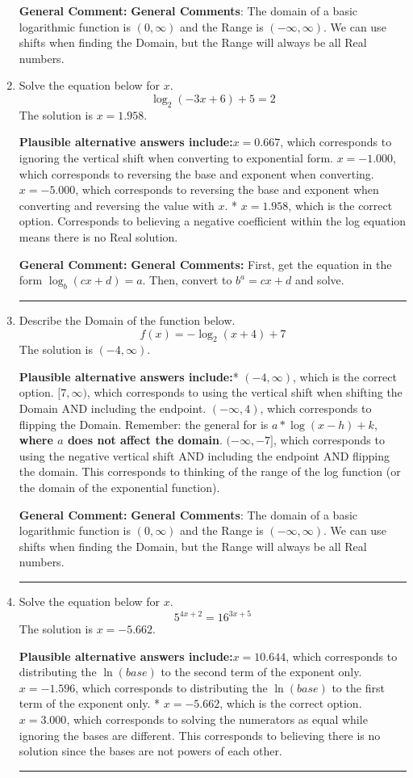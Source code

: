 \documentclass{extbook}[14pt]
\newcommand{\litem}[1]{\item #1

\rule{\textwidth}{0.4pt}}
\begin{document}
\begin{enumerate}
{\textbf{General Comment:} \textbf{General Comments}: The domain of a basic logarithmic function is $(0, \infty)$ and the Range is $(-\infty, \infty)$. We can use shifts when finding the Domain, but the Range will always be all Real numbers.
}
\litem{
Solve the equation below for $x$.
\[ \log_{2}{(-3x+6)}+5 = 2 \]The solution is \( x = 1.958 \).\begin{enumerate}[label=\Alph*.]
\textbf{Plausible alternative answers include:}$x = 0.667$, which corresponds to ignoring the vertical shift when converting to exponential form.
$x = -1.000$, which corresponds to reversing the base and exponent when converting.
$x = -5.000$, which corresponds to reversing the base and exponent when converting and reversing the value with $x$.
* $x = 1.958$, which is the correct option.
Corresponds to believing a negative coefficient within the log equation means there is no Real solution.
\end{enumerate}

\textbf{General Comment:} \textbf{General Comments:} First, get the equation in the form $\log_b{(cx+d)} = a$. Then, convert to $b^a = cx+d$ and solve.
}
\litem{
Describe the Domain of the function below.
\[ f(x) = -\log_2{(x+4)}+7 \]The solution is \( (-4, \infty) \).\begin{enumerate}[label=\Alph*.]
\textbf{Plausible alternative answers include:}* $(-4, \infty)$, which is the correct option.
$[7, \infty)$, which corresponds to using the vertical shift when shifting the Domain AND including the endpoint.
$(-\infty, 4)$, which corresponds to flipping the Domain. Remember: the general for is $a*\log(x-h)+k$, \textbf{where $a$ does not affect the domain}.
$(-\infty, -7]$, which corresponds to using the negative vertical shift AND including the endpoint AND flipping the domain.
This corresponds to thinking of the range of the log function (or the domain of the exponential function).
\end{enumerate}

\textbf{General Comment:} \textbf{General Comments}: The domain of a basic logarithmic function is $(0, \infty)$ and the Range is $(-\infty, \infty)$. We can use shifts when finding the Domain, but the Range will always be all Real numbers.
}
\litem{
Solve the equation below for $x$.
\[ 5^{4x+2} = 16^{3x+5} \]The solution is \( x = -5.662 \).\begin{enumerate}[label=\Alph*.]
\textbf{Plausible alternative answers include:}$x = 10.644$, which corresponds to distributing the $\ln(base)$ to the second term of the exponent only.
$x = -1.596$, which corresponds to distributing the $\ln(base)$ to the first term of the exponent only.
* $x = -5.662$, which is the correct option.
$x = 3.000$, which corresponds to solving the numerators as equal while ignoring the bases are different.
This corresponds to believing there is no solution since the bases are not powers of each other.
\end{enumerate}

}
\end{enumerate}
\end{document}
